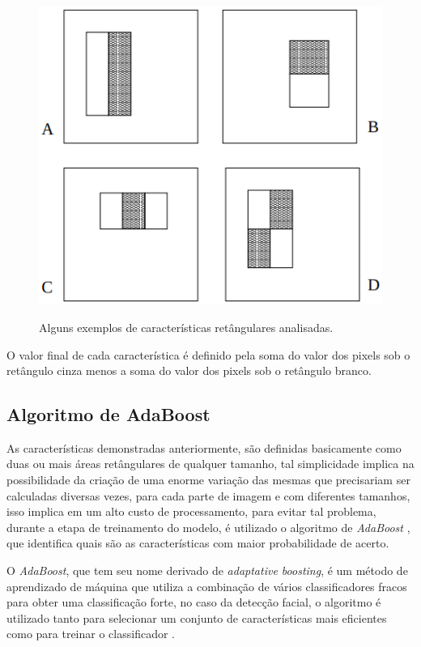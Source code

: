 \begin{figure}[htb]
    \centering
    \caption{Alguns exemplos de características retângulares analisadas.}
    \includegraphics[scale=.5]{figs/features.png}
    \label{fig:features}
 \end{figure}

 O valor final de cada característica é definido pela soma do valor dos pixels sob o retângulo cinza menos a soma do valor dos pixels sob o retângulo branco.

\subsection{Algoritmo de AdaBoost}

As características demonstradas anteriormente, são definidas basicamente como duas ou mais áreas retângulares de qualquer tamanho, tal simplicidade implica na possibilidade da criação de uma enorme variação das mesmas que precisariam ser calculadas diversas vezes, para cada parte de imagem e com diferentes tamanhos, isso implica em um alto custo de processamento, para evitar tal problema, durante a etapa de treinamento do modelo, é utilizado o algoritmo de \textit{AdaBoost} \cite{adaboost-Freund}, que identifica quais são as características com maior probabilidade de acerto.

O \textit{AdaBoost}, que tem seu nome derivado de \textit{adaptative boosting}, é um método de aprendizado de máquina que utiliza a combinação de vários classificadores fracos para obter uma classificação forte, no caso da detecção facial, o algoritmo é utilizado tanto para selecionar um conjunto de características mais eficientes como para treinar o classificador \cite{fabio-luciana-2015}.

